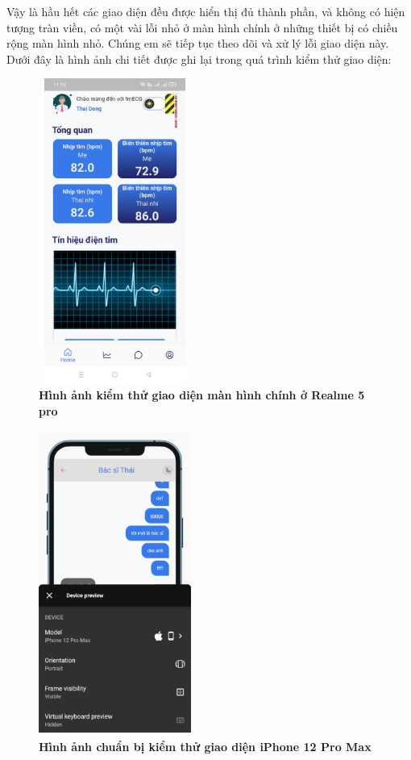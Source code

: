 Vậy là hầu hết các giao diện đều được hiển thị đủ thành phần, và không có hiện tượng tràn viền, có một vài lỗi nhỏ ở màn
hình chính ở những thiết bị có chiều rộng màn hình nhỏ. Chúng em sẽ tiếp tục theo dõi và xử lý lỗi giao diện này. Dưới
đây là hình ảnh chi tiết được ghi lại trong quá trình kiểm thử giao diện:

\begin{figure}[H]
  \centering
  \includegraphics[width=5cm,height=10cm]{Images/mobile_app/demo/realme_5_pro_device_preview.jpg}
  \caption[Hình ảnh kiểm thử giao diện màn hình chính ở Realme 5 pro]{\bfseries \fontsize{12pt}{0pt}
  \selectfont Hình ảnh kiểm thử giao diện màn hình chính ở Realme 5 pro}
  \label{realme_5_pro_device_preview}
\end{figure}
\begin{figure}[H]
  \centering
  \includegraphics[width=5cm,height=10cm]{Images/mobile_app/demo/ip12_pro_max_device_preview.png}
  \caption[Hình ảnh chuẩn bị kiểm thử giao diện iPhone 12 Pro Max]{\bfseries \fontsize{12pt}{0pt}
  \selectfont Hình ảnh chuẩn bị kiểm thử giao diện iPhone 12 Pro Max}
  \label{ip12_pro_max_device_preview}
\end{figure}

